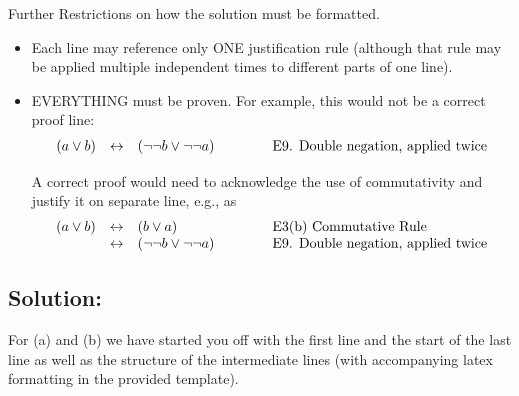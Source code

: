 \documentclass[12pt]{article}
\begin{document}
	Further Restrictions on how the solution must be formatted.
	\begin{itemize}
		\item Each line may reference only ONE justification rule (although that
			rule may be applied multiple independent times to different parts of one
			line).

		\item EVERYTHING must be proven. For example, this would not be a correct proof
			line:
			\[
				\begin{array}{lclcl}
					(a \vee b) & \leftrightarrow & (\neg \neg b \vee \neg \neg a) & \hspace*{.3in} & \mbox{E9. Double negation, applied twice} \\
				\end{array}
			\]

			A correct proof would need to acknowledge the use of commutativity and justify
			it on separate line, e.g., as
			\[
				\begin{array}{lclcl}
					(a \vee b) & \leftrightarrow & ( b \vee a)                    & \hspace*{.3in} & \mbox{E3(b) Commutative Rule}             \\
					           & \leftrightarrow & (\neg \neg b \vee \neg \neg a) & \hspace*{.3in} & \mbox{E9. Double negation, applied twice} \\
				\end{array}
			\]
	\end{itemize}

	\newpage
	\subsection*{\textbf{Solution:}}

	For (a) and (b) we have started you off with the first line and the start of the
	last line as well as the structure of the intermediate lines (with
	accompanying latex formatting in the provided template).
\end{document}
